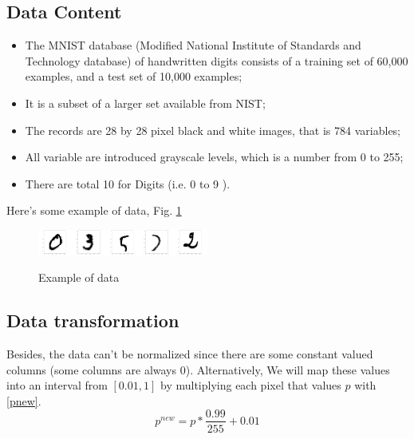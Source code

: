 \documentclass[conference]{IEEEtran}
\begin{document}
\subsection{Data Content}
\begin{itemize}
  \item The MNIST database (Modified National Institute of Standards and Technology database) of handwritten digits consists of a training set of 60,000 examples, and a test set of 10,000 examples;
  \item It is a subset of a larger set available from NIST;
  \item The records are 28 by 28 pixel black and white images, that is 784 variables;
  \item All variable are introduced grayscale levels, which is a number from 0 to 255;
  \item There are total 10 for Digits (i.e. 0 to 9 ).
\end{itemize}
Here's some example of data, Fig. \ref{Example of data}
\begin{figure}[htbp]
\centerline{\includegraphics[width=0.1\textwidth]{figure/0.png}\includegraphics[width=0.1\textwidth]{figure/3.png}\includegraphics[width=0.1\textwidth]{figure/5.png}\includegraphics[width=0.1\textwidth]{figure/2.png}\includegraphics[width=0.1\textwidth]{figure/8.png}}
\caption{Example of data}
\label{Example of data}
\end{figure}

\subsection{Data transformation}
Besides, the data can't be normalized since there are some constant valued columns (some columns are always $0$). Alternatively, We will map these values into an interval from $[0.01, 1]$ by multiplying each pixel that values $p$ with \eqref{pnew}.
\begin{equation}
	p^{new}=p*\frac{0.99}{255}+0.01\label{pnew}
\end{equation}
\end{document}

